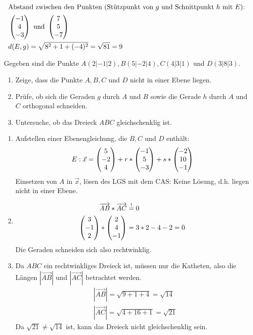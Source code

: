 \begin{lsg}{}
\begin{enumerate}
\begin{align*}
			\intertext{Abstand zwischen den Punkten (Stützpunkt von $g$ und Schnittpunkt $h$ mit $E$):}
			&\begin{pmatrix} -1 \\ 4 \\ -3 \end{pmatrix} \text{ und } \begin{pmatrix} 7\\5\\-7 \end{pmatrix} \\
			&d(E,g)=\sqrt{8^2+1+(-4)^2}=\sqrt{81}=9
		\end{align*}
	\end{enumerate}
\end{lsg}






 Gegeben sind die Punkte $A(2|-1|2), B(5|-2|4), C(4|3|1)$ und $D(3|8|3)$. \cas
\begin{enumerate}
	\item Zeige, dass die Punkte $A,B,C$ und $D$ nicht in einer Ebene liegen.
	\item Prüfe, ob sich die Geraden $g$ durch $A$ und $B$ sowie die Gerade $h$ durch $A$ und $C$ orthogonal schneiden.
	\item Untersuche, ob das Dreieck $ABC$ gleichschenklig ist.
\end{enumerate}
\begin{lsg}{}
	\begin{enumerate}
		\item Aufstellen einer Ebenengleichung, die $B,C$ und $D$ enthält:
		\begin{equation*}
			E: \vec x=\begin{pmatrix} 5\\-2\\4 \end{pmatrix}+r*\begin{pmatrix} -1\\5\\-3 \end{pmatrix}+s*\begin{pmatrix} -2\\10\\-1 \end{pmatrix}
		\end{equation*}
		Einsetzen von $A$ in $\vec x$, lösen des LGS mit dem CAS: Keine Lösung, d.h. liegen nicht in einer Ebene.
		\item\begin{align*}
			\overrightarrow{AB}*\overrightarrow{AC}&\overset!=0\\
			\begin{pmatrix} 3\\-1\\2 \end{pmatrix}*\begin{pmatrix} 2\\4\\-1 \end{pmatrix}&=3*2-4-2=0
		\end{align*}
		Die Geraden schneiden sich also rechtwinklig.
		\item Da $ABC$ ein rechtwinkliges Dreieck ist, müssen nur die Katheten, also die Längen $|\overrightarrow{AB}|$ und $|\overrightarrow{AC}|$ betrachtet werden.\begin{align*}
			&|\overrightarrow{AB}|=\sqrt{9+1+4}=\sqrt{14}\\
			&|\overrightarrow{AC}|=\sqrt{4+16+1}=\sqrt{21}
		\end{align*}
		Da $\sqrt{21}\neq \sqrt{14}$ ist, kann das Dreieck nicht gleichschenklig sein.
	\end{enumerate}
\end{lsg}




